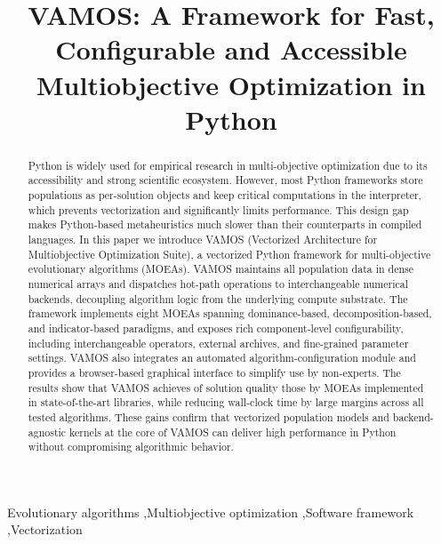 \documentclass[final,5p,times,twocolumn]{elsarticle}
\begin{document}
\begin{frontmatter}


\title{VAMOS: A Framework for Fast, Configurable and Accessible Multiobjective Optimization in Python}

\begin{abstract}
Python is widely used for empirical research in multi-objective optimization due to its accessibility and strong scientific ecosystem. However, most Python frameworks store populations as per-solution objects and keep critical computations in the interpreter, which prevents vectorization and significantly limits performance. This design gap makes Python-based metaheuristics much slower than their counterparts in compiled languages. In this paper we introduce VAMOS (Vectorized Architecture for Multiobjective Optimization Suite), a vectorized Python framework for multi-objective evolutionary algorithms (MOEAs). VAMOS maintains all population data in dense numerical arrays and dispatches hot-path operations to interchangeable numerical backends, decoupling algorithm logic from the underlying compute substrate. The framework implements eight MOEAs spanning dominance-based, decomposition-based, and indicator-based paradigms, and exposes rich component-level configurability, including interchangeable operators, external archives, and fine-grained parameter settings. VAMOS also integrates an automated algorithm-configuration module and provides a browser-based graphical interface to simplify use by non-experts. The results show that VAMOS achieves  of solution quality  those  by MOEAs implemented in state-of-the-art libraries, while reducing wall-clock time by large margins across all tested algorithms. These gains confirm that vectorized population models and backend-agnostic kernels at the core of VAMOS can deliver high performance in Python without compromising algorithmic behavior.
\end{abstract}

\begin{keyword}
Evolutionary algorithms \sep Multiobjective optimization \sep Software framework \sep Vectorization
\end{keyword}

\end{frontmatter}
\end{document}
